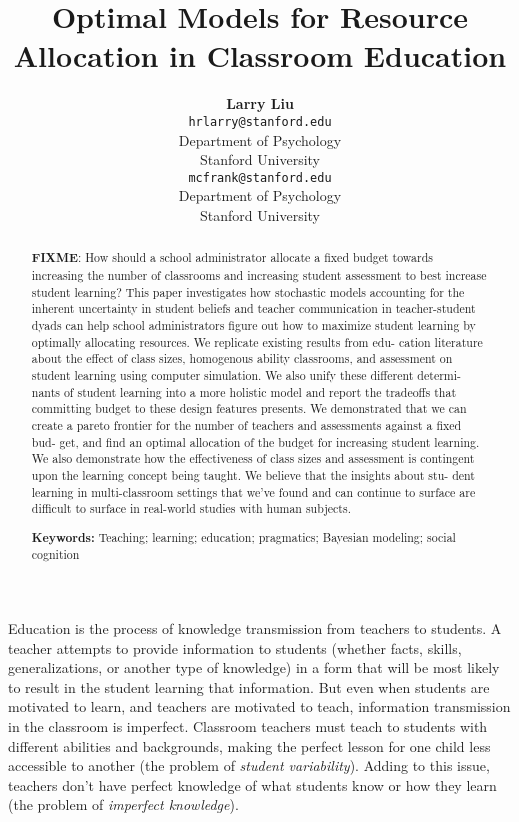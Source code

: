 \documentclass[10pt, letterpaper]{article}
\title{Optimal Models for Resource Allocation in Classroom Education}
\author{{\large \bf Larry Liu} \\ \texttt{hrlarry@stanford.edu} \\ Department of Psychology \\ Stanford University \And {\large \bf Michael C. Frank} \\ \texttt{mcfrank@stanford.edu} \\ Department of Psychology \\ Stanford University}
\begin{document}
\maketitle

\begin{abstract}
\textbf{FIXME}: How should a school administrator allocate a fixed
budget towards increasing the number of classrooms and increasing
student assessment to best increase student learning? This paper
investigates how stochastic models accounting for the inherent
uncertainty in student beliefs and teacher communication in
teacher-student dyads can help school administrators figure out how to
maximize student learning by optimally allocating resources. We
replicate existing results from edu- cation literature about the effect
of class sizes, homogenous ability classrooms, and assessment on student
learning using computer simulation. We also unify these different
determi- nants of student learning into a more holistic model and report
the tradeoffs that committing budget to these design features presents.
We demonstrated that we can create a pareto frontier for the number of
teachers and assessments against a fixed bud- get, and find an optimal
allocation of the budget for increasing student learning. We also
demonstrate how the effectiveness of class sizes and assessment is
contingent upon the learning concept being taught. We believe that the
insights about stu- dent learning in multi-classroom settings that we've
found and can continue to surface are difficult to surface in real-world
studies with human subjects.

\textbf{Keywords:}
Teaching; learning; education; pragmatics; Bayesian modeling; social
cognition
\end{abstract}

Education is the process of knowledge transmission from teachers to
students. A teacher attempts to provide information to students (whether
facts, skills, generalizations, or another type of knowledge) in a form
that will be most likely to result in the student learning that
information. But even when students are motivated to learn, and teachers
are motivated to teach, information transmission in the classroom is
imperfect. Classroom teachers must teach to students with different
abilities and backgrounds, making the perfect lesson for one child less
accessible to another (the problem of \emph{student variability}).
Adding to this issue, teachers don't have perfect knowledge of what
students know or how they learn (the problem of \emph{imperfect
knowledge}).
\end{document}
